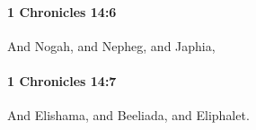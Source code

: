 		\paragraph{1 Chronicles 14:6} %
			\label{1CHRONICLES-14-6}

			And Nogah, and Nepheg, and Japhia,


		\paragraph{1 Chronicles 14:7} %
			\label{1CHRONICLES-14-7}

			And Elishama, and Beeliada, and Eliphalet.


